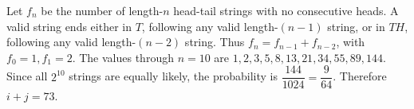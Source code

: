 Let $f_n$ be the number of length-$n$ head-tail strings with no consecutive heads. A valid string ends either in $T$, following any valid length-$(n-1)$ string, or in $TH$, following any valid length-$(n-2)$ string. Thus $f_n=f_{n-1}+f_{n-2}$, with $f_0=1,f_1=2$.
The values through $n=10$ are $1,2,3,5,8,13,21,34,55,89,144$. Since all $2^{10}$ strings are equally likely, the probability is $\dfrac{144}{1024}=\dfrac{9}{64}$. Therefore $\boxed{i+j=73}$.
